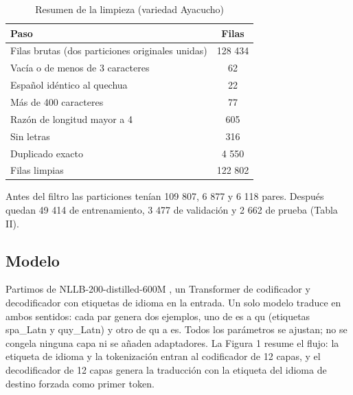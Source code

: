 \documentclass[conference]{IEEEtran}
\begin{document}
\begin{table}[!t]
\caption{Resumen de la limpieza (variedad Ayacucho)}
\label{tab:limpieza}
\centering\small
\begin{tabular}{lc}
\toprule
Paso & Filas \\
\midrule
Filas brutas (dos particiones originales unidas) & 128 434 \\
Vacía o de menos de 3 caracteres & 62 \\
Español idéntico al quechua & 22 \\
Más de 400 caracteres & 77 \\
Razón de longitud mayor a 4 & 605 \\
Sin letras & 316 \\
Duplicado exacto & 4 550 \\
Filas limpias & 122 802 \\
\bottomrule
\end{tabular}
\end{table}
Antes del filtro las particiones tenían 109 807, 6 877 y 6 118 pares. Después quedan 49 414 de entrenamiento, 3 477 de validación y 2 662 de prueba (Tabla II).

\begin{table}[!t]
\caption{Particiones antes y después del filtro de dominio}
\label{tab:particion}
\centering\small
{}
\end{table}
\subsection{Modelo}
Partimos de NLLB-200-distilled-600M \cite{r1}, un Transformer \cite{r2} de codificador y decodificador con etiquetas de idioma en la entrada. Un solo modelo traduce en ambos sentidos: cada par genera dos ejemplos, uno de es a qu (etiquetas spa\_Latn y quy\_Latn) y otro de qu a es. Todos los parámetros se ajustan; no se congela ninguna capa ni se añaden adaptadores. La Figura 1 resume el flujo: la etiqueta de idioma y la tokenización entran al codificador de 12 capas, y el decodificador de 12 capas genera la traducción con la etiqueta del idioma de destino forzada como primer token.
\end{document}
